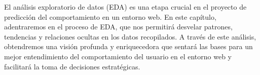 El análisis exploratorio de datos (EDA) es una etapa crucial en el proyecto de predicción del comportamiento en un entorno web. En este capítulo, adentraremos en el proceso de EDA, que nos permitirá desvelar patrones, tendencias y relaciones ocultas en los datos recopilados. A través de este análisis, obtendremos una visión profunda y enriquecedora que sentará las bases para un mejor entendimiento del comportamiento del usuario en el entorno web y facilitará la toma de decisiones estratégicas.